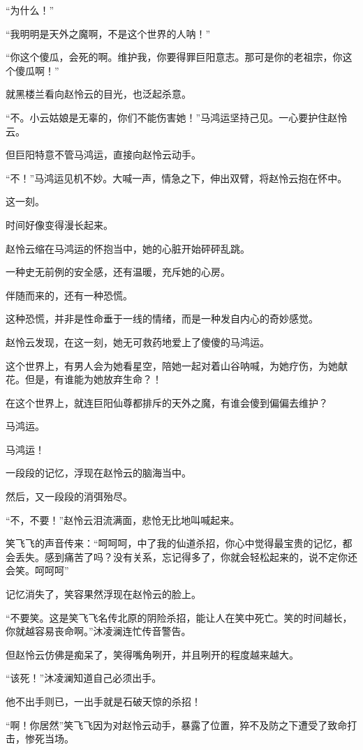 \begin{this_body}
“为什么！”

“我明明是天外之魔啊，不是这个世界的人呐！”

“你这个傻瓜，会死的啊。维护我，你要得罪巨阳意志。那可是你的老祖宗，你这个傻瓜啊！”

就黑楼兰看向赵怜云的目光，也泛起杀意。

“不。小云姑娘是无辜的，你们不能伤害她！”马鸿运坚持己见。一心要护住赵怜云。

但巨阳特意不管马鸿运，直接向赵怜云动手。

“不！”马鸿运见机不妙。大喊一声，情急之下，伸出双臂，将赵怜云抱在怀中。

这一刻。

时间好像变得漫长起来。

赵怜云缩在马鸿运的怀抱当中，她的心脏开始砰砰乱跳。

一种史无前例的安全感，还有温暖，充斥她的心房。

伴随而来的，还有一种恐慌。

这种恐慌，并非是性命垂于一线的情绪，而是一种发自内心的奇妙感觉。

赵怜云发现，在这一刻，她无可救药地爱上了傻傻的马鸿运。

这个世界上，有男人会为她看星空，陪她一起对着山谷呐喊，为她疗伤，为她献花。但是，有谁能为她放弃生命？！

在这个世界上，就连巨阳仙尊都排斥的天外之魔，有谁会傻到偏偏去维护？

马鸿运。

马鸿运！

一段段的记忆，浮现在赵怜云的脑海当中。

然后，又一段段的消弭殆尽。

“不，不要！”赵怜云泪流满面，悲怆无比地叫喊起来。

笑飞飞的声音传来：“呵呵呵，中了我的仙道杀招，你心中觉得最宝贵的记忆，都会丢失。感到痛苦了吗？没有关系，忘记得多了，你就会轻松起来的，说不定你还会笑。呵呵呵”

记忆消失了，笑容果然浮现在赵怜云的脸上。

“不要笑。这是笑飞飞名传北原的阴险杀招，能让人在笑中死亡。笑的时间越长，你就越容易丧命啊。”沐凌澜连忙传音警告。

但赵怜云仿佛是痴呆了，笑得嘴角咧开，并且咧开的程度越来越大。

“该死！”沐凌澜知道自己必须出手。

他不出手则已，一出手就是石破天惊的杀招！

“啊！你居然”笑飞飞因为对赵怜云动手，暴露了位置，猝不及防之下遭受了致命打击，惨死当场。


\end{this_body}
